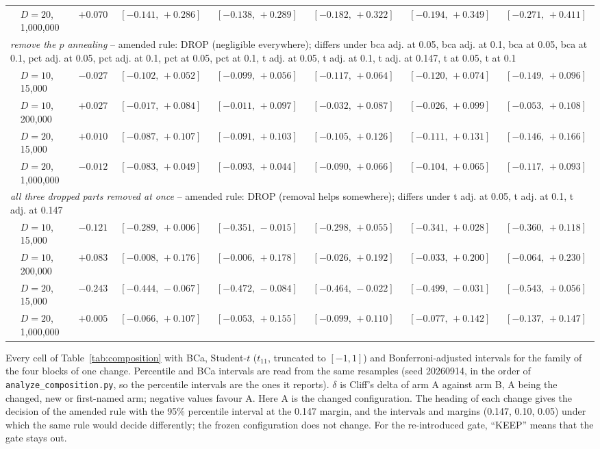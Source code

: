 \begin{table}[htbp]
{\begin{tabular}{llrccccc}
\quad & $D{=}20$, 1{,}000{,}000 & $+0.070$ & $[-0.141,\,+0.286]$ & $[-0.138,\,+0.289]$ & $[-0.182,\,+0.322]$ & $[-0.194,\,+0.349]$ & $[-0.271,\,+0.411]$ \\
\multicolumn{8}{l}{\emph{remove the $p$ annealing} -- amended rule: DROP (negligible everywhere); differs under bca adj. at 0.05, bca adj. at 0.1, bca at 0.05, bca at 0.1, pct adj. at 0.05, pct adj. at 0.1, pct at 0.05, pct at 0.1, t adj. at 0.05, t adj. at 0.1, t adj. at 0.147, t at 0.05, t at 0.1} \\
\quad & $D{=}10$, 15{,}000 & $-0.027$ & $[-0.102,\,+0.052]$ & $[-0.099,\,+0.056]$ & $[-0.117,\,+0.064]$ & $[-0.120,\,+0.074]$ & $[-0.149,\,+0.096]$ \\
\quad & $D{=}10$, 200{,}000 & $+0.027$ & $[-0.017,\,+0.084]$ & $[-0.011,\,+0.097]$ & $[-0.032,\,+0.087]$ & $[-0.026,\,+0.099]$ & $[-0.053,\,+0.108]$ \\
\quad & $D{=}20$, 15{,}000 & $+0.010$ & $[-0.087,\,+0.107]$ & $[-0.091,\,+0.103]$ & $[-0.105,\,+0.126]$ & $[-0.111,\,+0.131]$ & $[-0.146,\,+0.166]$ \\
\quad & $D{=}20$, 1{,}000{,}000 & $-0.012$ & $[-0.083,\,+0.049]$ & $[-0.093,\,+0.044]$ & $[-0.090,\,+0.066]$ & $[-0.104,\,+0.065]$ & $[-0.117,\,+0.093]$ \\
\multicolumn{8}{l}{\emph{\emph{all three dropped parts removed at once}} -- amended rule: DROP (removal helps somewhere); differs under t adj. at 0.05, t adj. at 0.1, t adj. at 0.147} \\
\quad & $D{=}10$, 15{,}000 & $-0.121$ & $[-0.289,\,+0.006]$ & $[-0.351,\,-0.015]$ & $[-0.298,\,+0.055]$ & $[-0.341,\,+0.028]$ & $[-0.360,\,+0.118]$ \\
\quad & $D{=}10$, 200{,}000 & $+0.083$ & $[-0.008,\,+0.176]$ & $[-0.006,\,+0.178]$ & $[-0.026,\,+0.192]$ & $[-0.033,\,+0.200]$ & $[-0.064,\,+0.230]$ \\
\quad & $D{=}20$, 15{,}000 & $-0.243$ & $[-0.444,\,-0.067]$ & $[-0.472,\,-0.084]$ & $[-0.464,\,-0.022]$ & $[-0.499,\,-0.031]$ & $[-0.543,\,+0.056]$ \\
\quad & $D{=}20$, 1{,}000{,}000 & $+0.005$ & $[-0.066,\,+0.107]$ & $[-0.053,\,+0.155]$ & $[-0.099,\,+0.110]$ & $[-0.077,\,+0.142]$ & $[-0.137,\,+0.147]$ \\
\bottomrule
\end{tabular}}
\begin{flushleft}\footnotesize
Every cell of Table~\ref{tab:composition} with BCa, Student-$t$ ($t_{11}$, truncated to $[-1,1]$) and Bonferroni-adjusted intervals for the family of the four blocks of one change. Percentile and BCa intervals are read from the same resamples (seed 20260914, in the order of \texttt{analyze\_composition.py}, so the percentile intervals are the ones it reports). $\delta$ is Cliff's delta of arm A against arm B, A being the changed, new or first-named arm; negative values favour A. Here A is the changed configuration. The heading of each change gives the decision of the amended rule with the 95\% percentile interval at the 0.147 margin, and the intervals and margins (0.147, 0.10, 0.05) under which the same rule would decide differently; the frozen configuration does not change. For the re-introduced gate, ``KEEP'' means that the gate stays out.

\end{flushleft}
\end{table}
